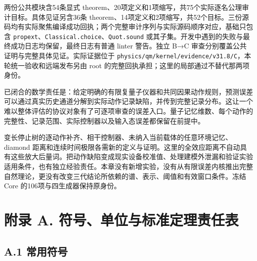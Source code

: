 \documentclass[
  11pt,
  oneside]{book}
\begin{document}
两份公共模块含54条显式
theorem、20项定义和1项缩写，共75个实际逐名公理审计目标。具体见证另含36条
theorem、14项定义和2项缩写，共52个目标。三份源码均有实际聚焦编译成功回执；两个完整审计序列与实际源码顺序对应，基础只包含
\texttt{propext}、\allowbreak \texttt{Classical.choice}、\allowbreak \texttt{Quot.sound}
或其子集。开发中遇到的失败与最终成功日志均保留，最终日志有普通 linter
警告。独立 B→C 审查分别覆盖公共证明与完整具体见证。实际证据位于
\texttt{physics/qm/kernel/evidence/v31.8/C}，本轮统一验收和远端发布另由
root 的完整回执承担；这里的局部通过不替代那两项身份。

已闭合的数学责任是：给定明确的有限复量子仪器和共同因果动作规则，预测误差可以通过真实历史通道分解到实际动作记录缺陷，并传到完整记录分布。这让一个难以整体评估的协议对象有了可逐项审查的误差入口。量子记忆维数、每个动作的完整性、记录范围、实际控制器以及输入态误差都保留在前提中。

变长停止树的逐动作补齐、相干控制器、未纳入当前载体的任意环境记忆、diamond
距离和连续时间极限各需新的定义与证明。这里的全效应距离不自动具有这些放大后量词。把动作缺陷变成现实设备校准值、处理建模外泄漏和验证实验适用条件，也有独立经验责任。本章没有新增实验，没有从有限误差内核推出完整自然理论，更没有改变三代结论所依赖的谱、表示、阈值和有效窗口条件。冻结
Core 的106项与四生成器保持原身份。

\hypertarget{appendix-a}{%
\chapter{附录 A. 符号、单位与标准定理责任表}\label{appendix-a}}

\hypertarget{a.1-ux5e38ux7528ux7b26ux53f7}{%
\section{A.1 常用符号}\label{a.1-ux5e38ux7528ux7b26ux53f7}}
\end{document}
